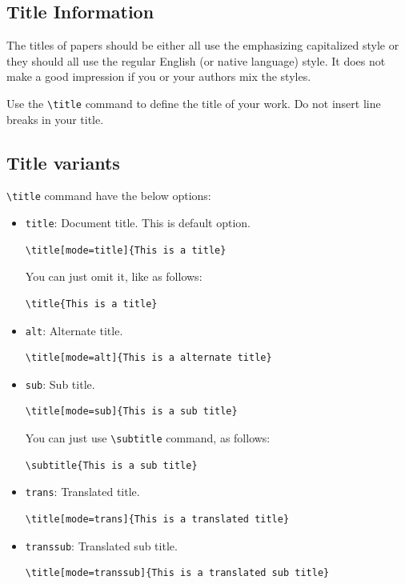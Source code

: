 \documentclass[
]{ceurart}
\begin{document}
\subsection{Title Information}

The titles of papers should be either all use the emphasizing
capitalized style or they should all use the regular English (or
native language) style. It does not make a good impression if you or
your authors mix the styles.

Use the \verb|\title| command to define the title of your work. Do not
insert line breaks in your title.

\subsection{Title variants}

\verb|\title| command have the below options:
\begin{itemize}
\item \verb|title|: Document title. This is default option. 
\begin{lstlisting}
\title[mode=title]{This is a title}
\end{lstlisting}
You can just omit it, like as follows:
\begin{lstlisting}
\title{This is a title}
\end{lstlisting}

\item \verb|alt|: Alternate title.
\begin{lstlisting}
\title[mode=alt]{This is a alternate title}
\end{lstlisting}

\item \verb|sub|: Sub title.
\begin{lstlisting}
\title[mode=sub]{This is a sub title}
\end{lstlisting}
You can just use \verb|\subtitle| command, as follows:
\begin{lstlisting}
\subtitle{This is a sub title}
\end{lstlisting}

\item \verb|trans|: Translated title.
\begin{lstlisting}
\title[mode=trans]{This is a translated title}
\end{lstlisting}

\item \verb|transsub|: Translated sub title.
\begin{lstlisting}
\title[mode=transsub]{This is a translated sub title}
\end{lstlisting}
\end{itemize}
\end{document}
